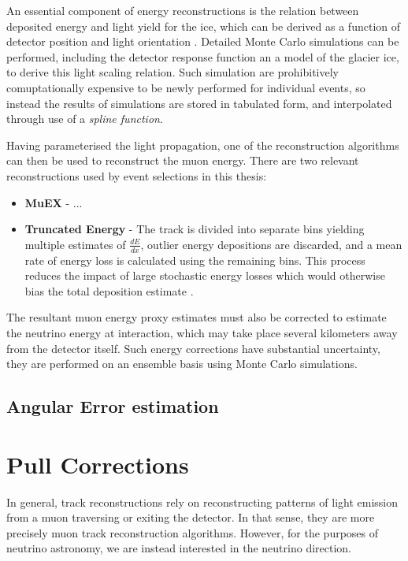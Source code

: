 An essential component of energy reconstructions is the relation between deposited energy and light yield for the ice, which can be derived as a function of detector position and light orientation \cite{ic_energy_reco_14}. Detailed Monte Carlo simulations can be performed, including the detector response function an a model of the glacier ice, to derive this light scaling relation. Such simulation are prohibitively comuptationally expensive to be newly performed for individual events, so instead the results of simulations are stored in tabulated form, and interpolated through use of a \emph{spline function}. 

Having parameterised the light propagation, one of the reconstruction algorithms can then be used to reconstruct the muon energy. There are two relevant reconstructions used by event selections in this thesis:

\begin{itemize}
	\item \textbf{MuEX} - ...
	\item \textbf{Truncated Energy} - The track is divided into separate bins yielding multiple estimates of $\frac{dE}{dx}$, outlier energy depositions are discarded, and a mean rate of energy loss is calculated using the remaining bins. This process reduces the impact of large stochastic energy losses which would otherwise bias the total deposition estimate \cite{ic_truncated_energy_13}.
\end{itemize}

The resultant muon energy proxy estimates must also be corrected to estimate the neutrino energy at interaction, which may take place several kilometers away from the detector itself. Such energy corrections have substantial uncertainty, they are performed on an ensemble basis using Monte Carlo simulations.

\subsection{Angular Error estimation}
\section{Pull Corrections}
\label{sec:pull_correction}
In general, track reconstructions rely on reconstructing patterns of light emission from a muon traversing or exiting the detector. In that sense, they are more precisely muon track reconstruction algorithms. However, for the purposes of neutrino astronomy, we are instead interested in the neutrino direction. 


